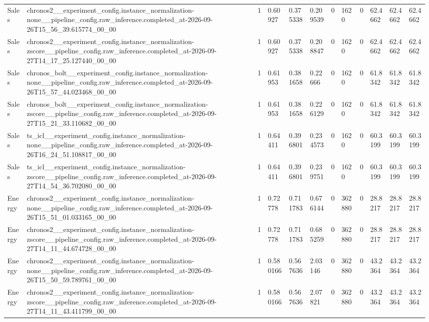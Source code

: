 \begin{tabular}{llllllllllll}
Sales & chronos2\_\_experiment\_config.instance\_normalization-none\_\_pipeline\_config.raw\_inference.completed\_at-2026-09-26T15\_56\_39.615774\_00\_00 & 1 & 0.60927 & 0.375338 & 0.209539 & 0 & 1620 & 0 & 62.4662 & 62.4662 & 62.4662 \\
Sales & chronos2\_\_experiment\_config.instance\_normalization-zscore\_\_pipeline\_config.raw\_inference.completed\_at-2026-09-27T14\_17\_25.127440\_00\_00 & 1 & 0.60927 & 0.375338 & 0.208847 & 0 & 1620 & 0 & 62.4662 & 62.4662 & 62.4662 \\
Sales & chronos\_bolt\_\_experiment\_config.instance\_normalization-none\_\_pipeline\_config.raw\_inference.completed\_at-2026-09-26T15\_57\_44.023468\_00\_00 & 1 & 0.61953 & 0.381658 & 0.22666 & 0 & 1620 & 0 & 61.8342 & 61.8342 & 61.8342 \\
Sales & chronos\_bolt\_\_experiment\_config.instance\_normalization-zscore\_\_pipeline\_config.raw\_inference.completed\_at-2026-09-27T15\_21\_33.110682\_00\_00 & 1 & 0.61953 & 0.381658 & 0.226129 & 0 & 1620 & 0 & 61.8342 & 61.8342 & 61.8342 \\
Sales & ts\_icl\_\_experiment\_config.instance\_normalization-none\_\_pipeline\_config.raw\_inference.completed\_at-2026-09-26T16\_24\_51.108817\_00\_00 & 1 & 0.64411 & 0.396801 & 0.234573 & 0 & 1620 & 0 & 60.3199 & 60.3199 & 60.3199 \\
Sales & ts\_icl\_\_experiment\_config.instance\_normalization-zscore\_\_pipeline\_config.raw\_inference.completed\_at-2026-09-27T14\_54\_36.702080\_00\_00 & 1 & 0.64411 & 0.396801 & 0.239751 & 0 & 1620 & 0 & 60.3199 & 60.3199 & 60.3199 \\
Energy & chronos2\_\_experiment\_config.instance\_normalization-none\_\_pipeline\_config.raw\_inference.completed\_at-2026-09-26T15\_51\_01.033165\_00\_00 & 1 & 0.72778 & 0.711783 & 0.676144 & 0 & 362880 & 0 & 28.8217 & 28.8217 & 28.8217 \\
Energy & chronos2\_\_experiment\_config.instance\_normalization-zscore\_\_pipeline\_config.raw\_inference.completed\_at-2026-09-27T14\_11\_44.674728\_00\_00 & 1 & 0.72778 & 0.711783 & 0.685259 & 0 & 362880 & 0 & 28.8217 & 28.8217 & 28.8217 \\
Energy & chronos2\_\_experiment\_config.instance\_normalization-none\_\_pipeline\_config.raw\_inference.completed\_at-2026-09-26T15\_50\_59.789761\_00\_00 & 1 & 0.580166 & 0.567636 & 2.03146 & 0 & 362880 & 0 & 43.2364 & 43.2364 & 43.2364 \\
Energy & chronos2\_\_experiment\_config.instance\_normalization-zscore\_\_pipeline\_config.raw\_inference.completed\_at-2026-09-27T14\_11\_43.411799\_00\_00 & 1 & 0.580166 & 0.567636 & 2.07821 & 0 & 362880 & 0 & 43.2364 & 43.2364 & 43.2364 \\

\end{tabular}
